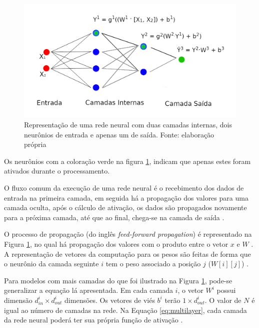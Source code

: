 \begin{figure}[ht]
	\centering
    \includegraphics[keepaspectratio=true,scale=1.3]{figuras/redeNeural}
	\caption[Rede Neural Simples]{Representação de uma rede neural com duas camadas internas, dois neurônios de entrada e apenas um de saída. Fonte: elaboração própria}
	\label{fig:redeNeural}
\end{figure}

Os neurônios com a coloração verde na figura \ref{fig:redeNeural}, indicam que apenas estes foram ativados durante o processamento.
 
O fluxo comum da execução de uma rede neural é o recebimento dos dados de entrada na primeira camada, em seguida há a propagação dos valores para uma camada oculta, após o cálculo de ativação, os dados são propagados novamente para a próxima camada, até que ao final, chega-se na camada de saída \cite{goldberg_neural_2017}.

O processo de propagação (do inglês \textit{feed-forward propagation}) é representado na Figura \ref{fig:redeNeural}, no qual há propagação dos valores com o produto entre o vetor $x$ e $W$ \cite{goldberg_neural_2017}. A representação de vetores da computação para os pesos são feitas de forma que o neurônio da camada seguinte $i$ tem o peso associado a posição $j$ ($W[i][j]$) \cite{nielsen_neural_2015}.

Para modelos com mais camadas do que foi ilustrado na Figura \ref{fig:redeNeural}, pode-se generalizar a equação lá apresentada. Em cada camada $i$, o vetor $W^{i}$ possui dimensão $d^{i}_{in} \times d^{i}_{out}$ dimensões. Os vetores de viés $b^{i}$ terão $1 \times d^{i}_{out}$. O valor de $N$ é igual ao número de camadas na rede. Na Equação \ref{eq:multilayer}, cada camada da rede neural poderá ter sua própria função de ativação \cite{goldberg_neural_2017}. 

